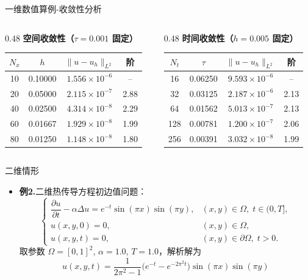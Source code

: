 \documentclass[aspectratio=169, xetex, 12pt]{beamer}  %
\begin{document}
	\begin{frame}{一维数值算例-收敛性分析}
		\begin{columns}[T, onlytextwidth]
			\begin{column}{0.48\textwidth}
				\centering
				\small
				\textbf{空间收敛性（$\tau=0.001$ 固定）}
				\vspace{0.1cm}
				\begin{tabular}{cccc}
					\toprule
					$N_x$ & $h$ & $\|u-u_h\|_{L^2}$ & 阶 \\
					\midrule
					10 & 0.10000 & $1.556\times10^{-6}$ & -- \\
					20 & 0.05000 & $2.115\times10^{-7}$ & 2.88 \\
					40 & 0.02500 & $4.314\times10^{-8}$ & 2.29 \\
					60 & 0.01667 & $1.929\times10^{-8}$ & 1.99 \\
					80 & 0.01250 & $1.148\times10^{-8}$ & 1.80 \\
					\bottomrule
				\end{tabular}
			\end{column}
			\begin{column}{0.48\textwidth}
				\centering
				\small
				\textbf{时间收敛性（$h=0.005$ 固定）}
				\vspace{0.1cm}
				\begin{tabular}{cccc}
					\toprule
					$N_t$ & $\tau$ & $\|u-u_h\|_{L^2}$ & 阶 \\
					\midrule
					16  & 0.06250 & $9.593\times10^{-6}$ & -- \\
					32  & 0.03125 & $2.187\times10^{-6}$ & 2.13 \\
					64  & 0.01562 & $5.013\times10^{-7}$ & 2.13 \\
					128 & 0.00781 & $1.200\times10^{-7}$ & 2.06 \\
					256 & 0.00391 & $3.032\times10^{-8}$ & 1.99 \\
					\bottomrule
				\end{tabular}
			\end{column}
		\end{columns}
	\end{frame}
	
\begin{frame}{二维情形}
	\begin{itemize}
		\item \textbf{例2.}二维热传导方程初边值问题：
		\[
		\begin{cases}
			\dfrac{\partial u}{\partial t} - \alpha \Delta u =e^{-t}\sin(\pi x)\sin(\pi y), & (x, y)\in\Omega,\; t\in(0,T], \\[6pt]
			u(x, y, 0) =0, & (x, y)\in\Omega, \\[6pt]
			u(x, y, t) = 0, & (x, y)\in\partial\Omega,\; t>0.
		\end{cases}
		\]
		取参数 $\Omega = [0,1]^2$, $\alpha = 1.0$, $T=1.0$，解析解为
		\[
		u(x,y,t) = \frac{1}{2\pi^2-1}\bigl(e^{-t}-e^{-2\pi^2 t}\bigr)\sin(\pi x)\sin(\pi y)
		\]
	\end{itemize}
	
\end{frame}
	
\end{document}
